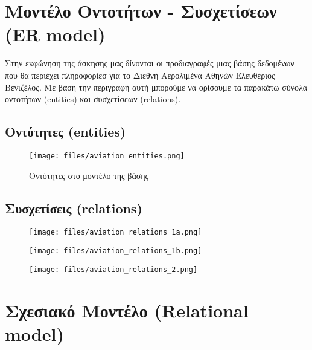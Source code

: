 \documentclass[11pt,a4paper]{article}
\begin{document}

\section{Μοντέλο Οντοτήτων - Συσχετίσεων (ER model)}
Στην εκφώνηση της άσκησης μας δίνονται οι προδιαγραφές μιας βάσης δεδομένων που θα περιέχει
πληροφορίεσ για το Διεθνή Αερολιμένα Αθηνών Ελευθέριος Βενιζέλος. Με βάση την
περιγραφή αυτή μπορούμε να ορίσουμε τα παρακάτω σύνολα οντοτήτων (entities)
και συσχετίσεων (relations).

\subsection{Οντότητες (entities)}
\begin{figure}[h]
\centering
\texttt{[image: files/aviation\_entities.png]}\\
\caption{Οντότητες στο μοντέλο της βάσης}
\end{figure}

\pagebreak
\subsection{Συσχετίσεις (relations)}
\begin{figure}[h]
\centering
\texttt{[image: files/aviation\_relations\_1a.png]}\\
\end{figure}

\begin{figure}[h]
\centering
\texttt{[image: files/aviation\_relations\_1b.png]}\\
\end{figure}

\begin{figure}[h]
\centering
\texttt{[image: files/aviation\_relations\_2.png]}\\
\end{figure}
\pagebreak

\section{Σχεσιακό Μοντέλο  (Relational model)}
\end{document}
